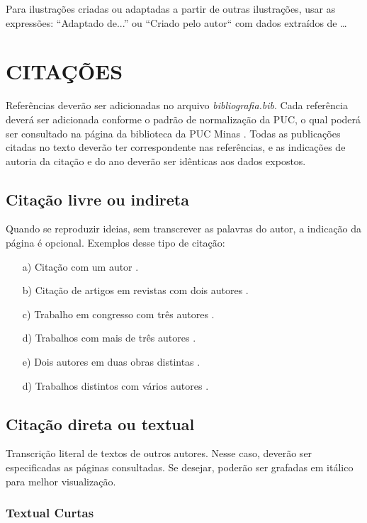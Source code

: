 Para ilustrações criadas ou adaptadas a partir de outras ilustrações, usar as expressões:
“Adaptado de...” ou “Criado pelo autor`` com dados extraídos de \ldots


\section{\esp CITAÇÕES}


Referências deverão ser adicionadas no arquivo \textit{bibliografia.bib}. Cada referência deverá ser adicionada conforme o padrão de normalização da PUC,
o qual poderá ser consultado na página da biblioteca da PUC Minas \cite{manualpuc}. Todas as publicações citadas no texto deverão ter correspondente nas referências,
e as indicações de autoria da citação e do ano deverão ser idênticas aos dados expostos.


\subsection{\esp Citação livre ou indireta}

Quando se reproduzir ideias, sem transcrever as palavras do autor, a indicação da página é opcional. Exemplos desse tipo de citação:
\begin{enumerate}
	\item [a)] Citação com um autor \cite{knuth}.
	\item [b)] Citação de artigos em revistas com dois autores \cite{artigo01}.
	\item [c)] Trabalho em congresso com três autores \cite{dovzan:01}.
	\item [d)] Trabalhos com mais de três autores \cite{cap-livro}.
	\item [e)] Dois autores em duas obras distintas \cite{knuth,groupp}.
	\item [d)] Trabalhos distintos com vários autores \cite{congresso,cap-livro}.

\end{enumerate}

\subsection{\esp Citação direta ou textual}

Transcrição literal de textos de outros autores. Nesse caso, deverão ser especificadas as páginas consultadas.
Se desejar, poderão ser grafadas em itálico para melhor visualização.

\subsubsection{\esp Textual Curtas}

